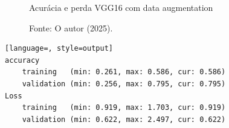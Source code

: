 \begin{figure}[h!]
\centering
\caption{Acurácia e perda VGG16 com data augmentation}
\hspace*{-2cm} %
\caption*{Fonte: O autor (2025).}
\end{figure}

\begin{lstlisting}[language=, style=output]
accuracy
	training   (min: 0.261, max: 0.586, cur: 0.586)
	validation (min: 0.256, max: 0.795, cur: 0.795)
Loss
	training   (min: 0.919, max: 1.703, cur: 0.919)
	validation (min: 0.622, max: 2.497, cur: 0.622)
\end{lstlisting}


